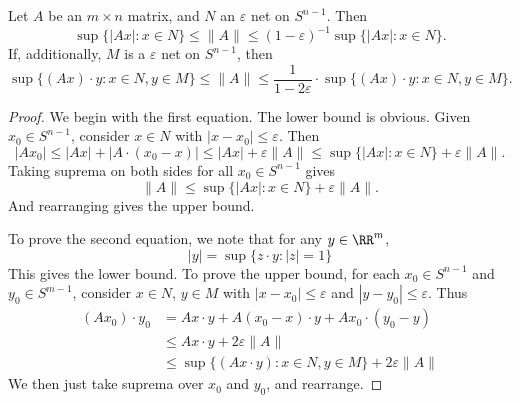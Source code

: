 \begin{lemma}
    Let $A$ be an $m \times n$ matrix, and $N$ an $\varepsilon$ net on $S^{n-1}$. Then
    \[ \sup \{ |Ax| : x \in N \} \leq \| A \| \leq (1 - \varepsilon)^{-1} \sup \{ |Ax| : x \in N \}. \]
    If, additionally, $M$ is a $\varepsilon$ net on $S^{n-1}$, then
    \[ \sup \{ (Ax) \cdot y : x \in N, y \in M \} \leq \| A \| \leq \frac{1}{1 - 2\varepsilon} \cdot \sup \{ (Ax) \cdot y : x \in N, y \in M \}. \]
\end{lemma}
\begin{proof}
    We begin with the first equation. The lower bound is obvious. Given $x_0 \in S^{n-1}$, consider $x \in N$ with $|x - x_0| \leq \varepsilon$. Then
    \[ |Ax_0| \leq |Ax| + |A \cdot (x_0 - x)| \leq |Ax| + \varepsilon \| A \| \leq \sup \{ |Ax| : x \in N \} + \varepsilon \| A \|. \]
    Taking suprema on both sides for all $x_0 \in S^{n-1}$ gives
    \[ \| A \| \leq \sup \{ |Ax| : x \in N \} + \varepsilon \| A \|.  \]
    And rearranging gives the upper bound.

    To prove the second equation, we note that for any $y \in \RR^m$,
    \[ |y| = \sup \{ z \cdot y : |z| = 1 \} \]
    This gives the lower bound. To prove the upper bound, for each $x_0 \in S^{n-1}$ and $y_0 \in S^{m-1}$, consider $x \in N$, $y \in M$ with $|x - x_0| \leq \varepsilon$ and $|y - y_0| \leq \varepsilon$. Thus
    \begin{align*}
        (Ax_0) \cdot y_0 &= Ax \cdot y + A(x_0 - x) \cdot y + Ax_0 \cdot (y_0 - y)\\
        &\leq Ax \cdot y + 2\varepsilon \| A \|\\
        &\leq \sup \{ (Ax \cdot y) : x \in N, y \in M \} + 2\varepsilon \| A \|
    \end{align*}
    We then just take suprema over $x_0$ and $y_0$, and rearrange.
\end{proof}



